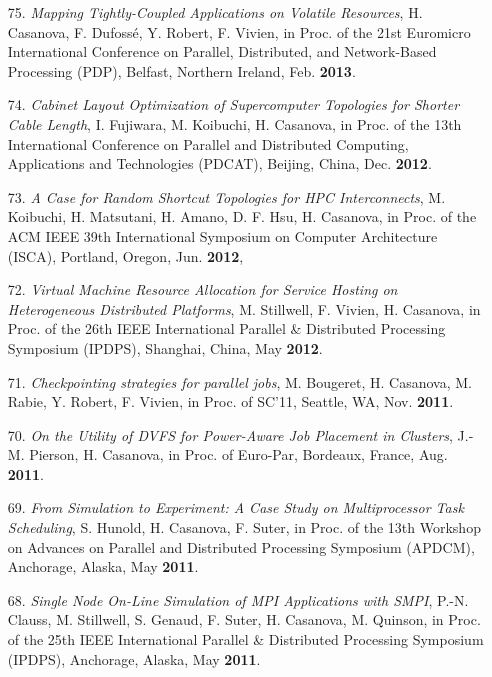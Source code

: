 \begin{enumerate}
\item[75.] {\it Mapping Tightly-Coupled Applications on Volatile Resources}, H.
Casanova, F. Dufoss\'e, Y. Robert, F. Vivien, in Proc. of the 21st
Euromicro International Conference on Parallel, Distributed, and Network-Based
Processing  (PDP), Belfast, Northern Ireland, Feb. {\bf 2013}.


\item[74.] {\it Cabinet Layout Optimization of Supercomputer Topologies for
Shorter Cable Length}, I. Fujiwara, M. Koibuchi, H. Casanova, in Proc. of
the 13th International Conference on Parallel and Distributed Computing,
Applications and Technologies (PDCAT), Beijing, China, Dec. {\bf 2012}.

\item[73.] {\it A Case for Random Shortcut Topologies for HPC Interconnects}, M.
Koibuchi, H. Matsutani, H. Amano, D. F. Hsu, H. Casanova, 
in Proc. of the ACM IEEE 39th International Symposium on Computer
Architecture (ISCA), Portland, Oregon, Jun. {\bf 2012},


\item[72.] {\it Virtual Machine Resource Allocation for Service Hosting on Heterogeneous Distributed Platforms}, M. Stillwell, F. Vivien, H. Casanova,
in Proc. of the 26th  IEEE International
Parallel \& Distributed Processing Symposium (IPDPS), Shanghai,
China, May {\bf 2012}.  


\item[71.] {\it Checkpointing strategies for parallel jobs}, M.
Bougeret, H. Casanova, M. Rabie, Y. Robert, F. Vivien, in Proc.
of SC'11, Seattle, WA, Nov. {\bf 2011}.


\item[70.] {\it On the Utility of DVFS for Power-Aware Job Placement
in Clusters}, J.-M. Pierson, H. Casanova, in Proc. of Euro-Par,
Bordeaux, France, Aug. {\bf 2011}.


\item[69.] {\it From Simulation to Experiment: A Case Study on
Multiprocessor Task Scheduling}, S. Hunold, H. Casanova, F. Suter, in
Proc. of the 13th Workshop on Advances on Parallel and
Distributed Processing Symposium (APDCM), Anchorage, Alaska,
May {\bf 2011}.

\item[68.] {\it Single Node On-Line Simulation of MPI Applications
with SMPI}, P.-N. Clauss, M. Stillwell, S. Genaud, F. Suter, H.
Casanova, M. Quinson, in Proc. of the 25th  IEEE International
Parallel \& Distributed Processing Symposium (IPDPS), Anchorage,
Alaska, May {\bf 2011}.


\end{enumerate}
